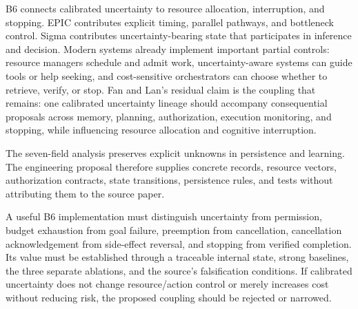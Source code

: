 \begin{chapterrecap}
B6 connects calibrated uncertainty to resource allocation, interruption, and stopping. EPIC contributes explicit timing, parallel pathways, and bottleneck control. Sigma contributes uncertainty-bearing state that participates in inference and decision. Modern systems already implement important partial controls: resource managers schedule and admit work, uncertainty-aware systems can guide tools or help seeking, and cost-sensitive orchestrators can choose whether to retrieve, verify, or stop. Fan and Lan's residual claim is the coupling that remains: one calibrated uncertainty lineage should accompany consequential proposals across memory, planning, authorization, execution monitoring, and stopping, while influencing resource allocation and cognitive interruption.

The seven-field analysis preserves explicit unknowns in persistence and learning. The engineering proposal therefore supplies concrete records, resource vectors, authorization contracts, state transitions, persistence rules, and tests without attributing them to the source paper.

A useful B6 implementation must distinguish uncertainty from permission, budget exhaustion from goal failure, preemption from cancellation, cancellation acknowledgement from side-effect reversal, and stopping from verified completion. Its value must be established through a traceable internal state, strong baselines, the three separate ablations, and the source's falsification conditions. If calibrated uncertainty does not change resource/action control or merely increases cost without reducing risk, the proposed coupling should be rejected or narrowed.
\end{chapterrecap}

